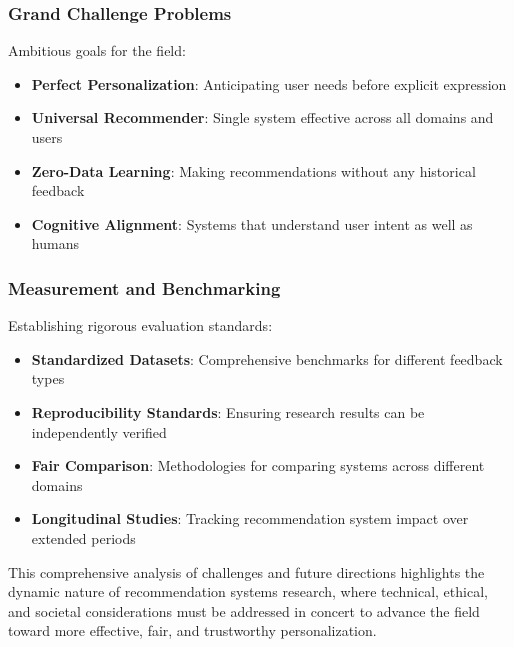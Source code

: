 \subsubsection{Grand Challenge Problems}

Ambitious goals for the field:

\begin{itemize}
    \item \textbf{Perfect Personalization}: Anticipating user needs before explicit expression
    \item \textbf{Universal Recommender}: Single system effective across all domains and users
    \item \textbf{Zero-Data Learning}: Making recommendations without any historical feedback
    \item \textbf{Cognitive Alignment}: Systems that understand user intent as well as humans
\end{itemize}

\subsubsection{Measurement and Benchmarking}

Establishing rigorous evaluation standards:

\begin{itemize}
    \item \textbf{Standardized Datasets}: Comprehensive benchmarks for different feedback types
    \item \textbf{Reproducibility Standards}: Ensuring research results can be independently verified
    \item \textbf{Fair Comparison}: Methodologies for comparing systems across different domains
    \item \textbf{Longitudinal Studies}: Tracking recommendation system impact over extended periods
\end{itemize}

This comprehensive analysis of challenges and future directions highlights the dynamic nature of recommendation systems research, where technical, ethical, and societal considerations must be addressed in concert to advance the field toward more effective, fair, and trustworthy personalization.
